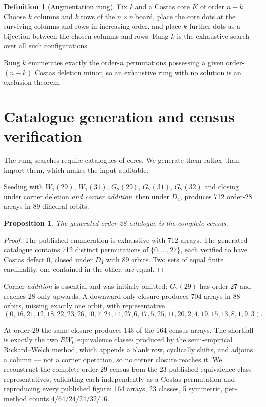 \documentclass[11pt,a4paper]{article}
\newtheorem{proposition}[theorem]{Proposition}
\theoremstyle{definition}
\newtheorem{definition}[theorem]{Definition}
\theoremstyle{remark}
\begin{document}
\begin{definition}[Augmentation rung]
Fix $k$ and a Costas core $K$ of order $n-k$. Choose $k$ columns and $k$ rows of
the $n\times n$ board, place the core dots at the surviving columns and rows in
increasing order, and place $k$ further dots as a bijection between the chosen
columns and rows. Rung $k$ is the exhaustive search over all such configurations.
\end{definition}

Rung $k$ enumerates exactly the order-$n$ permutations possessing a given
order-$(n-k)$ Costas deletion minor, so an exhaustive rung with no solution is an
exclusion theorem.

\section{Catalogue generation and census verification}
\label{sec:cat}

The rung searches require catalogues of cores. We generate them rather than
import them, which makes the input auditable.

Seeding with $W_1(29)$, $W_1(31)$, $G_2(29)$, $G_2(31)$, $G_2(32)$ and closing
under corner deletion \emph{and corner addition}, then under $D_4$, produces 712
order-28 arrays in 89 dihedral orbits.

\begin{proposition}\label{prop:cat28}
The generated order-28 catalogue is the complete census.
\end{proposition}
\begin{proof}
The published enumeration is exhaustive with 712 arrays. The generated catalogue
contains 712 distinct permutations of $\{0,\dots,27\}$, each verified to have
Costas defect 0, closed under $D_4$ with 89 orbits. Two sets of equal finite
cardinality, one contained in the other, are equal.
\end{proof}

Corner \emph{addition} is essential and was initially omitted: $G_2(29)$ has
order 27 and reaches 28 only upwards. A downward-only closure produces 704 arrays
in 88 orbits, missing exactly one orbit, with representative
\[
(0,16,21,12,18,22,23,26,10,7,24,14,27,6,17,5,25,11,20,2,4,19,15,13,8,1,9,3).
\]

At order 29 the same closure produces 148 of the 164 census arrays. The
shortfall is exactly the two $RW_0$ equivalence classes produced by the
semi-empirical Rickard--Welch method, which appends a blank row, cyclically
shifts, and adjoins a column --- not a corner operation, so no corner closure
reaches it. We reconstruct the complete order-29 census from the 23 published
equivalence-class representatives, validating each independently as a Costas
permutation and reproducing every published figure: 164 arrays, 23 classes, 5
symmetric, per-method counts $4/64/24/24/32/16$.
\end{document}
